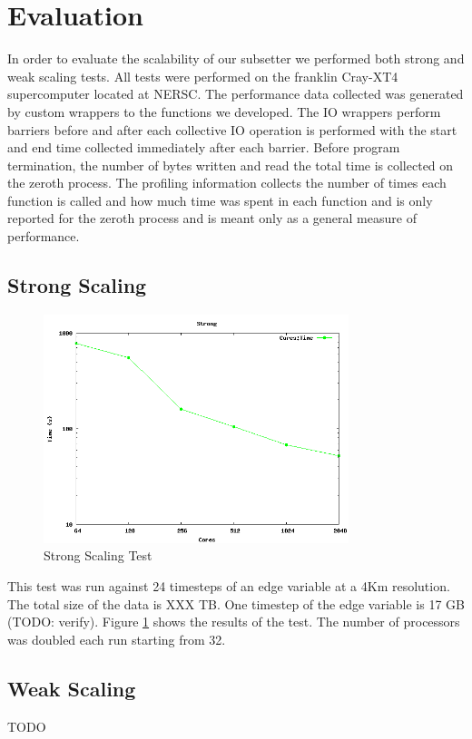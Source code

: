 \section{Evaluation}
\label{section:evaluation}

In order to evaluate the scalability of our subsetter we performed both strong
and weak scaling tests.  All tests were performed on the franklin Cray-XT4
supercomputer\cite{franklin} located at NERSC\cite{NERSC}.  The performance
data collected was generated by custom wrappers to the functions we developed.
The IO wrappers perform barriers before and after each collective IO operation
is performed with the start and end time collected immediately after each
barrier.  Before program termination, the number of bytes written and read the
total time is collected on the zeroth process.  The profiling information
collects the number of times each function is called and how much time was
spent in each function and is only reported for the zeroth process and is
meant only as a general measure of performance.

\subsection{Strong Scaling}

\begin{figure}[!t]
\center
\includegraphics[width=3.5in]{plots/strong}
\caption{Strong Scaling Test}
\label{fig:strong}
\end{figure}

This test was run against 24 timesteps of an edge variable at a 4Km
resolution.  The total size of the data is XXX TB.  One timestep of the edge
variable is 17 GB (TODO: verify).  Figure \ref{fig:strong} shows the results
of the test.  The number of processors was doubled each run starting from 32.

\subsection{Weak Scaling}

TODO
